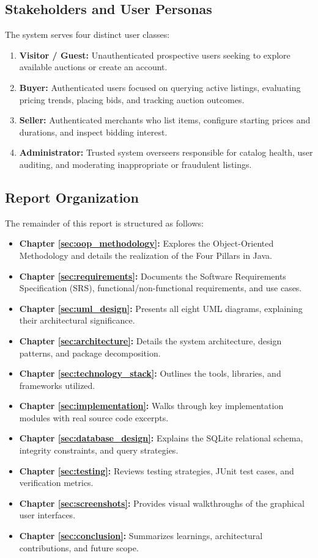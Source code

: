 \subsection{Stakeholders and User Personas}
The system serves four distinct user classes:
\begin{enumerate}
    \item \textbf{Visitor / Guest:} Unauthenticated prospective users seeking to explore available auctions or create an account.
    \item \textbf{Buyer:} Authenticated users focused on querying active listings, evaluating pricing trends, placing bids, and tracking auction outcomes.
    \item \textbf{Seller:} Authenticated merchants who list items, configure starting prices and durations, and inspect bidding interest.
    \item \textbf{Administrator:} Trusted system overseers responsible for catalog health, user auditing, and moderating inappropriate or fraudulent listings.
\end{enumerate}

\subsection{Report Organization}
The remainder of this report is structured as follows:
\begin{itemize}[noitemsep]
    \item \textbf{Chapter \ref{sec:oop_methodology}:} Explores the Object-Oriented Methodology and details the realization of the Four Pillars in Java.
    \item \textbf{Chapter \ref{sec:requirements}:} Documents the Software Requirements Specification (SRS), functional/non-functional requirements, and use cases.
    \item \textbf{Chapter \ref{sec:uml_design}:} Presents all eight UML diagrams, explaining their architectural significance.
    \item \textbf{Chapter \ref{sec:architecture}:} Details the system architecture, design patterns, and package decomposition.
    \item \textbf{Chapter \ref{sec:technology_stack}:} Outlines the tools, libraries, and frameworks utilized.
    \item \textbf{Chapter \ref{sec:implementation}:} Walks through key implementation modules with real source code excerpts.
    \item \textbf{Chapter \ref{sec:database_design}:} Explains the SQLite relational schema, integrity constraints, and query strategies.
    \item \textbf{Chapter \ref{sec:testing}:} Reviews testing strategies, JUnit test cases, and verification metrics.
    \item \textbf{Chapter \ref{sec:screenshots}:} Provides visual walkthroughs of the graphical user interfaces.
    \item \textbf{Chapter \ref{sec:conclusion}:} Summarizes learnings, architectural contributions, and future scope.
\end{itemize}
